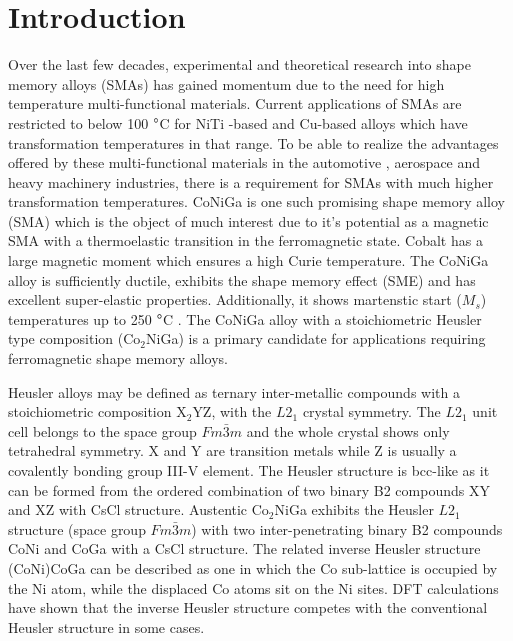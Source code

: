 \documentclass[%
preprint,
 amsmath,amssymb,
 aps,
prb,
showkeys,
]{revtex4-1}
\begin{document}

	\maketitle

\section{Introduction}
\label{Sec:intro}

Over the last few decades, experimental and theoretical research into shape memory alloys (SMAs) has gained momentum due to the need for high temperature multi-functional materials. Current  applications of SMAs are restricted to below 100 $\degree$C for NiTi -based  and Cu-based alloys  which have transformation temperatures in that range.  To be able to realize the advantages offered by these multi-functional materials in the automotive , aerospace and heavy machinery industries, there is a requirement for  SMAs with much higher transformation temperatures. CoNiGa is one such promising shape memory alloy (SMA) which is the object of much interest due to it's potential as a  magnetic SMA with a thermoelastic transition in the ferromagnetic state\cite{
siewert2010electronic}. Cobalt has a large magnetic moment which ensures a high Curie temperature. The CoNiGa alloy is sufficiently ductile, exhibits the shape memory effect (SME) and has excellent super-elastic properties\cite{dai2005superelasticity}.  Additionally, it shows martenstic start ($M_s$) temperatures up to 250 $\degree$C \cite{liu2006effect}.
The CoNiGa alloy with a stoichiometric Heusler type composition (Co$_2$NiGa) is a primary candidate for applications requiring ferromagnetic shape memory alloys\cite{dogan2011microstructure,canadinc2007role,oikawa2001promising,murakami2002magnetic}.

Heusler alloys may be defined as ternary inter-metallic compounds with a stoichiometric composition X$_2$YZ, with the $L2_1$ crystal symmetry. The $L2_1$ unit cell belongs to the space group $Fm\bar{3}m$ and the whole crystal shows only tetrahedral symmetry. X and Y are transition metals while Z is usually a covalently bonding group III-V element. The Heusler structure is bcc-like as it can be formed from the ordered combination of two binary B2
compounds XY and XZ with CsCl structure\cite{dannenberg2011ab}.
Austentic Co$_2$NiGa exhibits the Heusler $L2_1$ structure (space group $Fm\bar{3}m$) with two inter-penetrating binary B2 compounds CoNi and CoGa with a CsCl structure. The related inverse Heusler structure (CoNi)CoGa can be described as one in which the Co sub-lattice is occupied by the Ni atom, while the displaced Co atoms sit on the Ni sites. DFT calculations have shown that the inverse Heusler structure competes with the conventional Heusler structure in some cases\cite{yamada2014synthesis}. 
\end{document}
